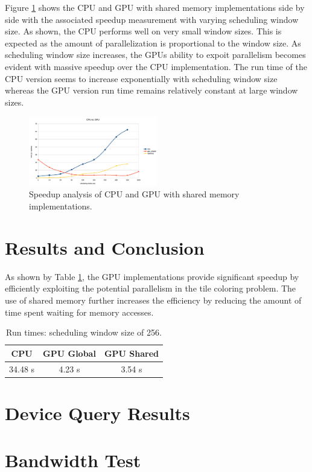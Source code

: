 \documentclass[journal]{IEEEtran}
\begin{document}
Figure \ref{fig:speedup} shows the CPU and GPU with shared memory implementations side by side with the associated speedup measurement with varying scheduling window size. As shown, the CPU performs well on very small window sizes. This is expected as the amount of parallelization is proportional to the window size. As scheduling window size increases, the GPUs ability to expoit parallelism becomes evident with massive speedup over the CPU implementation. The run time of the CPU version seems to increase exponentially with scheduling window size whereas the GPU version run time remains relatively constant at large window sizes.
%
\begin{figure}[ht]
\centering
\includegraphics[width=0.5\textwidth]{speedup_graph}
\caption{Speedup analysis of CPU and GPU with shared memory implementations.}
\label{fig:speedup}
\end{figure}
%
\section{Results and Conclusion}

As shown by Table \ref{tab:runtime}, the GPU implementations provide significant speedup by efficiently exploiting the potential parallelism in the tile coloring problem. The use of shared memory further increases the efficiency by reducing the amount of time spent waiting for memory accesses.

\begin{table}[ht]
\renewcommand{\arraystretch}{1.3}
\caption{Run times: scheduling window size of 256.}
\label{tab:runtime}
\centering
\begin{tabular}{|c|c|c|}
  CPU & GPU Global & GPU Shared \\
\hline
  34.48 s & 4.23 s & 3.54 s \\
\end{tabular}
\end{table}


\newpage
\appendices
\section{Device Query Results}
\section{Bandwidth Test}


\newpage

% 
% 
\end{document}
